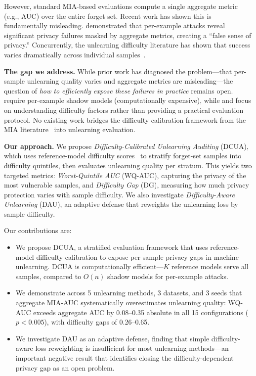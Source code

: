 \documentclass{article}
\begin{document}
However, standard MIA-based evaluations compute a single aggregate metric (e.g., AUC) over the entire forget set.
Recent work has shown this is fundamentally misleading.
\citet{hayes2025inexact} demonstrated that per-example attacks reveal significant privacy failures masked by aggregate metrics, creating a ``false sense of privacy.''
Concurrently, the unlearning difficulty literature has shown that success varies dramatically across individual samples~\citep{rizwan2024instance,zhao2024what,cheng2026toward}.

\textbf{The gap we address.}
While prior work has diagnosed the problem---that per-sample unlearning quality varies and aggregate metrics are misleading---the question of \emph{how to efficiently expose these failures in practice} remains open.
\citet{hayes2025inexact} require per-example shadow models (computationally expensive), while \citet{zhao2024what} and \citet{rizwan2024instance} focus on understanding difficulty factors rather than providing a practical evaluation protocol.
No existing work bridges the difficulty calibration framework from the MIA literature~\citep{watson2022importance} into unlearning evaluation.

\textbf{Our approach.}
We propose \emph{Difficulty-Calibrated Unlearning Auditing} (DCUA), which uses reference-model difficulty scores~\citep{watson2022importance,carlini2022membership} to stratify forget-set samples into difficulty quintiles, then evaluates unlearning quality per stratum.
This yields two targeted metrics: \emph{Worst-Quintile AUC} (WQ-AUC), capturing the privacy of the most vulnerable samples, and \emph{Difficulty Gap} (DG), measuring how much privacy protection varies with sample difficulty.
We also investigate \emph{Difficulty-Aware Unlearning} (DAU), an adaptive defense that reweights the unlearning loss by sample difficulty.

Our contributions are:
\begin{itemize}
    \item We propose DCUA, a stratified evaluation framework that uses reference-model difficulty calibration to expose per-sample privacy gaps in machine unlearning. DCUA is computationally efficient---$K$ reference models serve all samples, compared to $O(n)$ shadow models for per-example attacks.
    \item We demonstrate across 5 unlearning methods, 3 datasets, and 3 seeds that aggregate MIA-AUC systematically overestimates unlearning quality: WQ-AUC exceeds aggregate AUC by 0.08--0.35 absolute in all 15 configurations ($p < 0.005$), with difficulty gaps of 0.26--0.65.
    \item We investigate DAU as an adaptive defense, finding that simple difficulty-aware loss reweighting is insufficient for most unlearning methods---an important negative result that identifies closing the difficulty-dependent privacy gap as an open problem.
\end{itemize}
\end{document}
